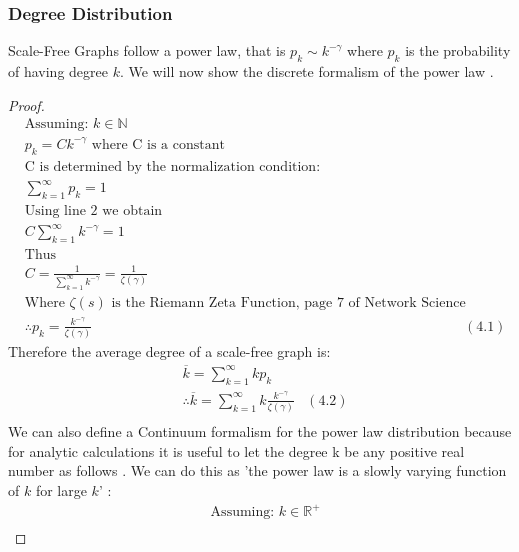 \documentclass{article}
\begin{document}
            \subsubsection{Degree Distribution}
            Scale-Free Graphs follow a power law, that is $p_{k} \sim k^{-\gamma}$ where $p_{k}$ is the probability of having degree $k$. We will now show the discrete formalism of the power law \parencite{barabasi2013network}.
            \begin{proof}
                \begin{align*}
                    &\text{Assuming: } k\in \mathbb{N}\\
                    &p_{k} = Ck^{-\gamma} \text{ where C is a constant}\\
                    &\text{C is determined by the normalization condition: }\\
                    &\sum_{k = 1}^{\infty}p_{k} = 1\\
                    &\text{Using line 2 we obtain}\\
                    &C\sum_{k=1}^{\infty}k^{-\gamma} = 1\\
                    &\text{Thus}\\
                    &C = \frac{1}{\sum_{k=1}^{\infty}k^{-\gamma}} = \frac{1}{\zeta(\gamma)}\\
                    &\text{Where $\zeta(s)$ is the Riemann Zeta Function, page 7 of Network Science}\\
                    &\therefore p_{k}=\frac{k^{-\gamma}}{\zeta(\gamma)} &(4.1)
                \end{align*}
                Therefore the average degree of a scale-free graph is:
                \begin{align*}
                    &\overline{k} = \sum_{k=1}^{\infty}kp_{k}\\
                    &\therefore \overline{k} = \sum_{k=1}^{\infty}k\frac{k^{-\gamma}}{\zeta(\gamma)} &(4.2)\\
                \end{align*}
                We can also define a Continuum formalism for the power law distribution because for analytic calculations it is useful to let the degree k be any positive real number as follows \parencite{barabasi2013network}. We can do this as 'the power law is a slowly varying function of $k$ for large $k$' \parencite{yang2013networks}:
                \begin{align*}
                    &\text{Assuming: } k\in \mathbb{R}^{+}\\

\end{align*}
\end{proof}
\end{document}
